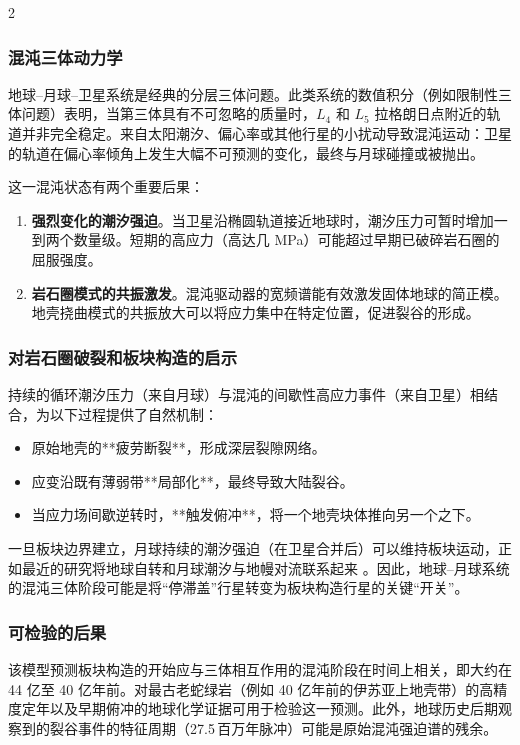 \documentclass[11pt,a4paper]{article}
\begin{document}
\begin{multicols}{2}
		\subsubsection{混沌三体动力学}
		
		地球–月球–卫星系统是经典的分层三体问题。此类系统的数值积分（例如限制性三体问题）表明，当第三体具有不可忽略的质量时，\(L_{4}\) 和 \(L_{5}\) 拉格朗日点附近的轨道并非完全稳定。来自太阳潮汐、偏心率或其他行星的小扰动导致混沌运动：卫星的轨道在偏心率倾角上发生大幅不可预测的变化，最终与月球碰撞或被抛出。
		
		这一混沌状态有两个重要后果：
		
		\begin{enumerate}
			\item \textbf{强烈变化的潮汐强迫}。当卫星沿椭圆轨道接近地球时，潮汐压力可暂时增加一到两个数量级。短期的高应力（高达几 MPa）可能超过早期已破碎岩石圈的屈服强度。
			\item \textbf{岩石圈模式的共振激发}。混沌驱动器的宽频谱能有效激发固体地球的简正模。地壳挠曲模式的共振放大可以将应力集中在特定位置，促进裂谷的形成。
		\end{enumerate}
		
		\subsubsection{对岩石圈破裂和板块构造的启示}
		
		持续的循环潮汐压力（来自月球）与混沌的间歇性高应力事件（来自卫星）相结合，为以下过程提供了自然机制：
		
		\begin{itemize}
			\item 原始地壳的**疲劳断裂**，形成深层裂隙网络。
			\item 应变沿既有薄弱带**局部化**，最终导致大陆裂谷。
			\item 当应力场间歇逆转时，**触发俯冲**，将一个地壳块体推向另一个之下。
		\end{itemize}
		
		一旦板块边界建立，月球持续的潮汐强迫（在卫星合并后）可以维持板块运动，正如最近的研究将地球自转和月球潮汐与地幔对流联系起来 \cite{Rampino2021}。因此，地球–月球系统的混沌三体阶段可能是将“停滞盖”行星转变为板块构造行星的关键“开关”。
		
		\subsubsection{可检验的后果}
		
		该模型预测板块构造的开始应与三体相互作用的混沌阶段在时间上相关，即大约在 44 亿至 40 亿年前。对最古老蛇绿岩（例如 40 亿年前的伊苏亚上地壳带）的高精度定年以及早期俯冲的地球化学证据可用于检验这一预测。此外，地球历史后期观察到的裂谷事件的特征周期（27.5 百万年脉冲）可能是原始混沌强迫谱的残余。
		

\end{multicols}
\end{document}
